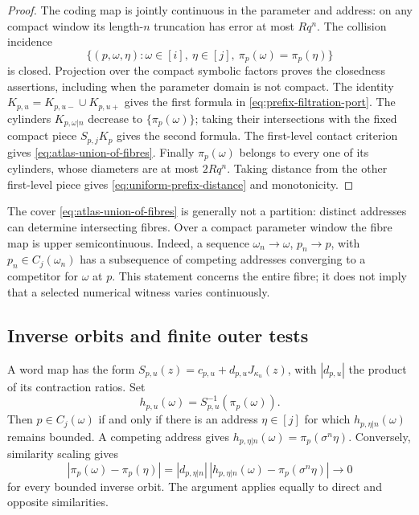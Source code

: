 \begin{proof}
The coding map is jointly continuous in the parameter and address: on any
compact window its length-$n$ truncation has error at most $Rq^n$.
The collision incidence
\[
 \{(p,\omega,\eta):\omega\in[i],\ \eta\in[j],\
       \pi_p(\omega)=\pi_p(\eta)\}
\]
is closed. Projection over the compact symbolic factors proves the
closedness assertions, including when the parameter domain is not compact.
The identity $K_{p,u}=K_{p,u-}\cup K_{p,u+}$ gives the first formula in
\eqref{eq:prefix-filtration-port}. The cylinders $K_{p,\omega|n}$ decrease
to $\{\pi_p(\omega)\}$; taking their intersections with the fixed compact
piece $S_{p,j}K_p$ gives the second formula. The first-level contact
criterion gives \eqref{eq:atlas-union-of-fibres}.
Finally $\pi_p(\omega)$ belongs to every one of its cylinders, whose
diameters are at most $2Rq^n$. Taking distance from the other first-level
piece gives \eqref{eq:uniform-prefix-distance} and monotonicity.
\end{proof}

The cover \eqref{eq:atlas-union-of-fibres} is generally not a partition:
distinct addresses can determine intersecting fibres. Over a compact
parameter window the fibre map is upper semicontinuous. Indeed, a sequence
$\omega_n\to\omega$, $p_n\to p$, with $p_n\in C_j(\omega_n)$ has a
subsequence of competing addresses converging to a competitor for $\omega$
at $p$. This statement concerns the entire fibre; it does not imply that a
selected numerical witness varies continuously.

\subsection{Inverse orbits and finite outer tests}

A word map has the form
$S_{p,u}(z)=c_{p,u}+d_{p,u}J_{\kappa_u}(z)$, with
$|d_{p,u}|$ the product of its contraction ratios. Set
\[
 h_{p,u}(\omega)=S_{p,u}^{-1}(\pi_p(\omega)).
\]
Then $p\in C_j(\omega)$ if and only if there is an address $\eta\in[j]$
for which $h_{p,\eta|n}(\omega)$ remains bounded. A competing address gives
$h_{p,\eta|n}(\omega)=\pi_p(\sigma^n\eta)$. Conversely, similarity scaling
gives
\[
 |\pi_p(\omega)-\pi_p(\eta)|
 =|d_{p,\eta|n}|\,
 |h_{p,\eta|n}(\omega)-\pi_p(\sigma^n\eta)|\longrightarrow0
\]
for every bounded inverse orbit. The argument applies equally to direct
and opposite similarities.

